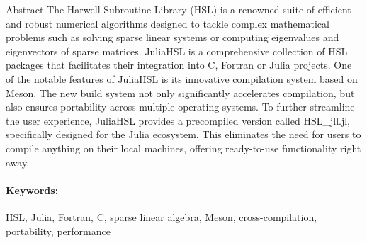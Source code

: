 \documentclass[gdweb]{geradwp}
\newcommand{\JuliaHSL}{JuliaHSL\xspace}  %
\newcommand{\HSLjll}{HSL\_jll.jl}
\begin{document}
\GDpageCouverture

\begin{GDpagetitre}

\begin{GDauthlist}
\end{GDauthlist}

\begin{GDaffillist}
\end{GDaffillist}

\begin{GDemaillist}
\end{GDemaillist}

\end{GDpagetitre}


\GDabstracts

\begin{GDabstract}{Abstract}
The Harwell Subroutine Library (HSL) is a renowned suite of efficient and robust numerical algorithms designed to tackle complex mathematical problems such as solving sparse linear systems or computing eigenvalues and eigenvectors of sparse matrices.
\JuliaHSL is a comprehensive collection of HSL packages that facilitates their integration into C, Fortran or Julia projects.
One of the notable features of \JuliaHSL is its innovative compilation system based on Meson.
The new build system not only significantly accelerates compilation, but also ensures portability across multiple operating systems.
To further streamline the user experience, \JuliaHSL provides a precompiled version called \HSLjll, specifically designed for the Julia ecosystem.
This eliminates the need for users to compile anything on their local machines, offering ready-to-use functionality right away.

\paragraph{Keywords: }
HSL, Julia, Fortran, C, sparse linear algebra, Meson, cross-compilation, portability, performance
\end{GDabstract}
\end{document}
